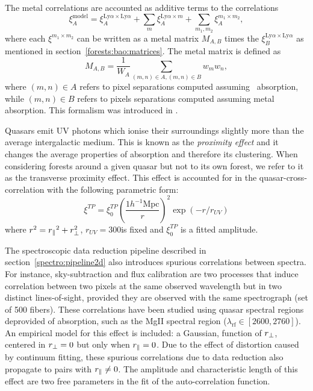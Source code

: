 The metal correlations are accounted as additive terms to the \lya 
correlations
\begin{equation}
\xi^\mathrm{model}_A =    \xi^{\mathrm{Ly}\alpha \times \mathrm{Ly}\alpha  }_A 
    + \sum_m \xi^{\mathrm{Ly}\alpha  \times m}_A
    + \sum_{m_1, m_2} \xi^{m_1 \times m_2}_A,
\end{equation}
where each $\xi^{m_1 \times m_2}$ can be written as a metal matrix 
$M_{A,B}$ times the $\xi^{\mathrm{Ly}\alpha \times \mathrm{Ly}\alpha  }_B$ 
as mentioned in section~\ref{forests:bao:matrices}. The metal matrix is 
defined as 
\begin{equation}
M_{A,B} = \frac{1}{W_A}  \sum_{(m,n)\in A, (m, n)\in B} w_m w_n, 
\end{equation}
where $(m, n)\in A$ refers to pixel separations computed assuming 
\lya\ absorption, while $(m, n)\in B$ refers to pixels separations  
computed assuming metal absorption. This formalism was introduced 
in \cite{blomqvistTriplyionizedCarbonForest2018}. 

Quasars emit UV photons which ionise their surroundings slightly 
more than the average intergalactic medium. This is known as the 
\emph{proximity effect} and it changes the average properties of 
\lya absorption and therefore its clustering. When considering 
forests around a given quasar but not to its own forest, we refer 
to it as the transverse proximity effect. This effect is accounted  
for in the quasar-\lya cross-correlation with the following parametric
form:
\begin{equation}
\xi^{TP} = \xi_0^{TP} \left( \frac{1 h^{-1} \mathrm{Mpc}}{r} \right)^2 \exp \left( - r /r_{UV} \right)
\end{equation}
where $r^2 = {r_\parallel}^2 + r^2_\perp$, $r_{UV} = 300$\hmpc is fixed and $\xi_0^{TP}$ 
is a fitted amplitude. 

The spectroscopic data reduction pipeline described in section~\ref{spectro:pipeline2d}
also introduces spurious correlations between spectra. 
For instance, sky-subtraction and flux calibration are two processes 
that induce correlation between two pixels at the same observed wavelength 
but in two distinct lines-of-sight, provided they are observed with the 
same spectrograph (set of 500 fibers). These correlations have been 
studied using quasar spectral regions deprovided of \lya absorption,
such as the MgII spectral region ($\lambda_\mathrm{rf} \in [2600, 2760]$\angstrom).
An empirical model for this effect is included: a Gaussian, function of ${r_\perp}$, centered in ${r_\perp} = 0$ 
but only when ${r_\parallel} = 0$. 
Due to the effect of distortion caused by continuum fitting, these spurious
correlations due to data reduction also propagate to pairs with ${r_\parallel} \neq 0$.  
The amplitude and characteristic length of this effect are two free parameters
in the fit of the \lya auto-correlation function.

